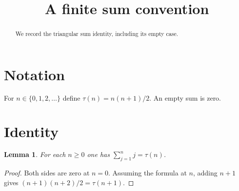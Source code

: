 \documentclass{article}
\title{A finite sum convention}
\newtheorem{lemma}{Lemma}
\begin{document}
\begin{abstract}
We record the triangular sum identity, including its empty case.
\end{abstract}
\section{Notation}
For $n\in\{0,1,2,\ldots\}$ define $\tau(n)=n(n+1)/2$.
An empty sum is zero.
\section{Identity}
\begin{lemma}\label{lem:sum}
For each $n\geq0$ one has $\sum_{j=1}^n j=\tau(n)$.
\end{lemma}
\begin{proof}
Both sides are zero at $n=0$. Assuming the formula at $n$,
adding $n+1$ gives $(n+1)(n+2)/2=\tau(n+1)$.
\end{proof}
\end{document}
